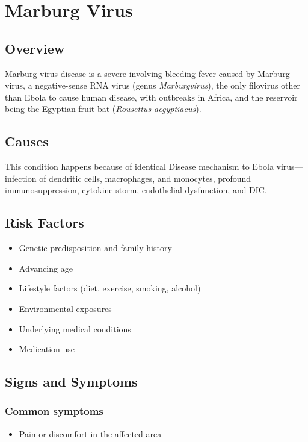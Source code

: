 \chapter{Marburg Virus}
\label{sec:Marburg Virus}

\section{Overview}
Marburg virus disease is a severe involving bleeding fever caused by Marburg virus, a negative-sense RNA virus (genus \textit{Marburgvirus}), the only filovirus other than Ebola to cause human disease, with outbreaks in Africa, and the reservoir being the Egyptian fruit bat (\textit{Rousettus aegyptiacus}).
\section{Causes}
This condition happens because of identical Disease mechanism to Ebola virus---infection of dendritic cells, macrophages, and monocytes, profound immunosuppression, cytokine storm, endothelial dysfunction, and DIC.     
\section{Risk Factors}

\begin{itemize}[noitemsep]
  \item Genetic predisposition and family history
  \item Advancing age
  \item Lifestyle factors (diet, exercise, smoking, alcohol)
  \item Environmental exposures
  \item Underlying medical conditions
  \item Medication use
\end{itemize}
\section{Signs and Symptoms}

\subsection{Common symptoms}
\begin{itemize}[noitemsep]
  \item Pain or discomfort in the affected area
  \end{itemize}

